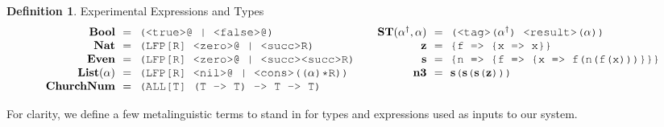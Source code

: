 \documentclass[acmsmall]{acmart}
\theoremstyle{definition}
\newtheorem{definition}{Definition}[section]
\begin{document}
\begin{definition} Experimental Expressions and Types  
  \label{def:experimental_expressions_and_types}
  \scriptsize
  \[
  \begin{array}[t]{ll}
    \begin{array}[t]{r@{}c@{}l}
      \textbf{Bool} 
      &\ \ =\ \ & 
      \J{(<true>@ | <false>@)} 
      \\
      \textbf{Nat} 
      &\ \ =\ \ & 
      \J{(LFP[R] <zero>@ | <succ>R)} 
      \\
      \textbf{Even} 
      &\ \ =\ \ & 
      \J{(LFP[R] <zero>@ | <succ><succ>R)} 
      \\
      \textbf{List}(\alpha) 
      &\ \ =\ \ & 
      \J{(LFP[R] <nil>@ | <cons>((}\alpha\J{)*R))} 
      \\
      \textbf{ChurchNum} 
      &\ \ =\ \ & 
      \J{(ALL[T] (T -> T) -> T -> T)}
    \end{array}
    &
    \begin{array}[t]{r@{}c@{}l}
      \textbf{ST}(\alpha^\dagger, \alpha) 
      &\ \ =\ \ & 
      \J{(<tag>(}\alpha^\dagger \J{) <result>(} \alpha \J{))}
      \\
      \textbf{z} 
      &\ \ =\ \ & 
      \J{\{f => \{x => x\}\}} 
      \\
      \textbf{s} 
      &\ \ =\ \ & 
      \J{\{n => \{f => \{x => f(n(f(x)))\}\}\}} 
      \\
      \textbf{n3} 
      &\ \ =\ \ & 
      \textbf{s}\J{(}\textbf{s}\J{(}\textbf{s}\J{(}\textbf{z}\J{)}\J{)}\J{)} 
    \end{array}
  \end{array}
  \]
\end{definition}

\noindent
For clarity, we define a few metalinguistic terms to stand in for 
types and expressions used as inputs to our system. 
\end{document}
